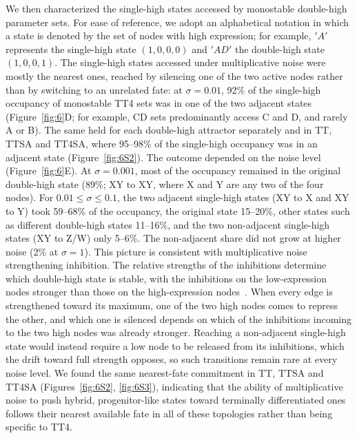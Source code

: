 \documentclass[11pt]{article}
\begin{document}
We then characterized the single-high states accessed by monostable double-high parameter sets. For ease of reference, we adopt an alphabetical notation in which a state is denoted by the set of nodes with high expression; for example, $'A'$ represents the single-high state $(1, 0, 0, 0)$ and $'AD'$ the double-high state $(1, 0, 0, 1)$. The single-high states accessed under multiplicative noise were mostly the nearest ones, reached by silencing one of the two active nodes rather than by switching to an unrelated fate: at $\sigma = 0.01$, 92\% of the single-high occupancy of monostable TT4 sets was in one of the two adjacent states (Figure~\ref{fig:6}D; for example, CD sets predominantly access C and D, and rarely A or B). The same held for each double-high attractor separately and in TT, TTSA and TT4SA, where 95--98\% of the single-high occupancy was in an adjacent state (Figure~\ref{fig:6S2}). The outcome depended on the noise level (Figure~\ref{fig:6}E). At $\sigma = 0.001$, most of the occupancy remained in the original double-high state (89\%; XY to XY, where X and Y are any two of the four nodes). For $0.01 \leq \sigma \leq 0.1$, the two adjacent single-high states (XY to X and XY to Y) took 59--68\% of the occupancy, the original state 15--20\%, other states such as different double-high states 11--16\%, and the two non-adjacent single-high states (XY to Z/W) only 5--6\%. The non-adjacent share did not grow at higher noise (2\% at $\sigma = 1$). This picture is consistent with multiplicative noise strengthening inhibition. The relative strengths of the inhibitions determine which double-high state is stable, with the inhibitions on the low-expression nodes stronger than those on the high-expression nodes~\cite{Duddu2024MultistabilityDifferentiation}. When every edge is strengthened toward its maximum, one of the two high nodes comes to repress the other, and which one is silenced depends on which of the inhibitions incoming to the two high nodes was already stronger. Reaching a non-adjacent single-high state would instead require a low node to be released from its inhibitions, which the drift toward full strength opposes, so such transitions remain rare at every noise level. We found the same nearest-fate commitment in TT, TTSA and TT4SA (Figures~\ref{fig:6S2}, \ref{fig:6S3}), indicating that the ability of multiplicative noise to push hybrid, progenitor-like states toward terminally differentiated ones follows their nearest available fate in all of these topologies rather than being specific to TT4.
\end{document}
